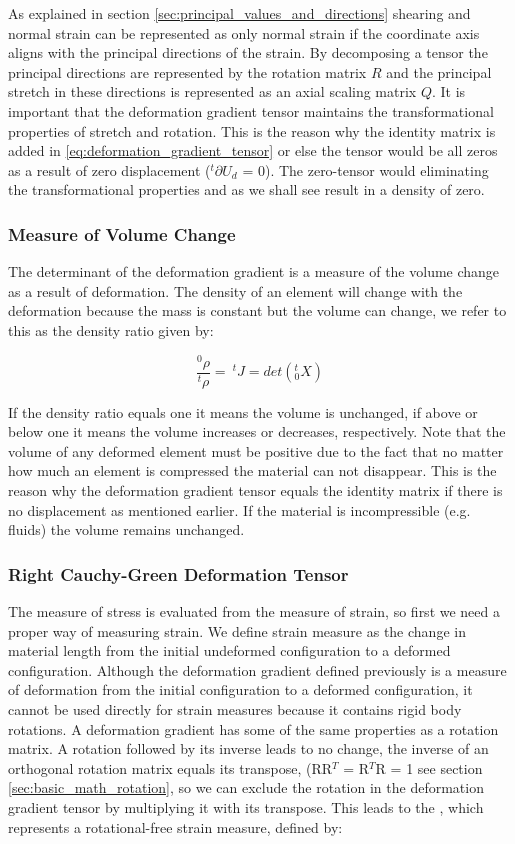 As explained in section \vref{sec:principal_values_and_directions}
shearing and normal
strain can be represented as only normal strain if the
coordinate axis aligns with the principal directions of the strain. By
decomposing a tensor the principal directions are
represented by the rotation matrix $R$ and the principal stretch in
these directions is represented as an axial scaling matrix $Q$. 
%
It is important that the deformation gradient
tensor maintains the transformational properties of stretch
and rotation. This is the reason why the identity matrix is added in
\eqref{eq:deformation_gradient_tensor} or else the tensor would
be all zeros as a result of zero displacement ($^t\partial U_d$ =
0). The zero-tensor would eliminating the transformational properties
and as we shall see result in a density of zero.

\subsubsection*{Measure of Volume Change}
The determinant of the deformation gradient is a measure of the volume
change as a result of deformation. The density of an element will
change with the deformation because the mass is constant but the
volume can change, we refer to this as the density ratio given
by: 

\begin{equation}
\label{eq:volume_change}
\frac{^0\rho}{^t\rho} = \ ^tJ = det(^t_0X)
\end{equation}

If the density ratio equals one it means
the volume is unchanged, if above or below one it means the volume increases or
decreases, respectively. Note that the volume of any deformed element
must be positive due to the fact that no matter how much an element is
compressed the material can not disappear. This is the reason why the
deformation gradient tensor equals the identity matrix if there is no
displacement as mentioned earlier. If the
material is incompressible (e.g. fluids) the volume remains unchanged.

\subsubsection*{Right Cauchy-Green Deformation Tensor}
The measure of stress is evaluated from the measure of strain, so
first we need a proper way of measuring strain. We define strain
measure as the change in material length from the initial undeformed
configuration to a deformed configuration. Although the deformation gradient defined
previously is a measure of deformation from the initial configuration
to a deformed configuration, it cannot be used directly for
strain measures because it contains rigid body rotations. A
deformation gradient has some of the same properties as a rotation matrix. 
A rotation followed by its inverse leads to no change, the inverse of
an orthogonal rotation matrix equals its transpose, 
(RR$^{T}$ = R$^{T}$R = 1 see section \vref{sec:basic_math_rotation},
so we can exclude the rotation in the 
deformation gradient tensor by multiplying it with its transpose.  
This leads to the , which
represents a rotational-free strain measure, defined by:

